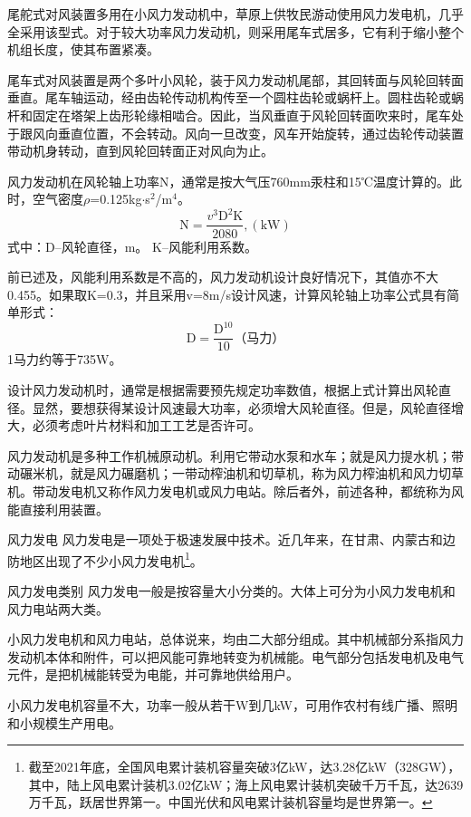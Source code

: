 \documentclass{ctexbook}
\begin{document}
尾舵式对风装置多用在小风力发动机中，草原上供牧民游动使用风力发电机，几乎全采用该型式。对于较大功率风力发动机，则采用尾车式居多，它有利于缩小整个机组长度，使其布置紧凑。

尾车式对风装置是两个多叶小风轮，装于风力发动机尾部，其回转面与风轮回转面垂直。尾车轴运动，经由齿轮传动机构传至一个圆柱齿轮或蜗杆上。圆柱齿轮或蜗杆和固定在塔架上齿形轮缘相啮合。因此，当风垂直于风轮回转面吹来时，尾车处于跟风向垂直位置，不会转动。风向一旦改变，风车开始旋转，通过齿轮传动装置带动机身转动，直到风轮回转面正对风向为止。

风力发动机在风轮轴上功率N，通常是按大气压760mm汞柱和15℃温度计算的。此时，空气密度$\rho$=0.125kg$\cdot$s$^{2}$/m$^4$。
\begin{equation*}
	\text{N}=\frac{v^{3}\text{D}^{2}\text{K}}{2080} , (\text{kW})
\end{equation*}
式中：D--风轮直径，m。
K--风能利用系数。

前已述及，风能利用系数是不高的，风力发动机设计良好情况下，其值亦不大0.455。如果取K=0.3，并且采用v=8m/s设计风速，计算风轮轴上功率公式具有简单形式：
\begin{equation*}
	\text{D}=\frac{\text{D}^{10}}{10} \text{（马力）}
\end{equation*}
1马力约等于735W。

设计风力发动机时，通常是根据需要预先规定功率数值，根据上式计算出风轮直径。显然，要想获得某设计风速最大功率，必须增大风轮直径。但是，风轮直径增大，必须考虑叶片材料和加工工艺是否许可。

风力发动机是多种工作机械原动机。利用它带动水泵和水车；就是风力提水机；带动碾米机，就是风力碾磨机；一带动榨油机和切草机，称为风力榨油机和风力切草机。带动发电机又称作风力发电机或风力电站。除后者外，前述各种，都统称为风能直接利用装置。

风力发电
风力发电是一项处于极速发展中技术。近几年来，在甘肃、内蒙古和边防地区出现了不少小风力发电机\footnote{截至2021年底，全国风电累计装机容量突破3亿kW，达3.28亿kW（328GW），其中，陆上风电累计装机3.02亿kW；海上风电累计装机突破千万千瓦，达2639万千瓦，跃居世界第一。中国光伏和风电累计装机容量均是世界第一。}。

风力发电类别
风力发电一般是按容量大小分类的。大体上可分为小风力发电机和风力电站两大类。

小风力发电机和风力电站，总体说来，均由二大部分组成。其中机械部分系指风力发动机本体和附件，可以把风能可靠地转变为机械能。电气部分包括发电机及电气元件，是把机械能转受为电能，并可靠地供给用户。

小风力发电机容量不大，功率一般从若干W到几kW，可用作农村有线广播、照明和小规模生产用电。
	
\end{document}
